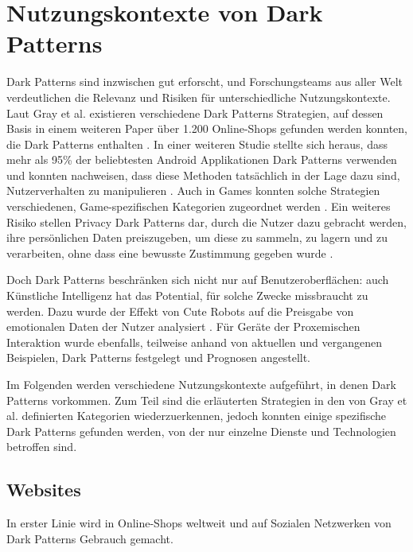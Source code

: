 \documentclass[a4paper]{article}
\begin{document}
\section{Nutzungskontexte von Dark Patterns} %
\label{sec:nutzungskontexte_von_dark_patterns}
Dark Patterns sind inzwischen gut erforscht, und Forschungsteams aus aller Welt verdeutlichen die Relevanz und Risiken für unterschiedliche Nutzungskontexte. Laut Gray et al. existieren verschiedene Dark Patterns Strategien, auf dessen Basis in einem weiteren Paper über 1.200 Online-Shops gefunden werden konnten, die Dark Patterns enthalten \cite{gray}\cite{mathur}. In einer weiteren Studie stellte sich heraus, dass mehr als 95\% der beliebtesten Android Applikationen Dark Patterns verwenden und konnten nachweisen, dass diese Methoden tatsächlich in der Lage dazu sind, Nutzerverhalten zu manipulieren \cite{geronimo}. Auch in Games konnten solche Strategien verschiedenen, Game-spezifischen Kategorien zugeordnet werden \cite{zagal}. Ein weiteres Risiko stellen \glqq Privacy Dark Patterns\grqq{} dar, durch die Nutzer dazu gebracht werden, ihre persönlichen Daten preiszugeben, um diese zu sammeln, zu lagern und zu verarbeiten, ohne dass eine bewusste Zustimmung gegeben wurde \cite{boesch}. 

Doch Dark Patterns beschränken sich nicht nur auf Benutzeroberflächen: auch Künstliche Intelligenz hat das Potential, für solche Zwecke missbraucht zu werden. Dazu wurde
der Effekt von \glqq Cute Robots\grqq{} auf die Preisgabe von emotionalen Daten der Nutzer analysiert \cite{lacey}. Für Geräte der Proxemischen Interaktion wurde ebenfalls, teilweise anhand von aktuellen und vergangenen Beispielen, Dark Patterns festgelegt und Prognosen angestellt.

Im Folgenden werden verschiedene Nutzungskontexte aufgeführt, in denen Dark Patterns vorkommen. Zum Teil sind die erläuterten Strategien in den von Gray et al. definierten Kategorien wiederzuerkennen, jedoch konnten einige spezifische Dark Patterns gefunden werden, von der nur einzelne Dienste und Technologien betroffen sind.

\subsection{Websites} 
\label{sub:websites}
In erster Linie wird in Online-Shops weltweit und auf Sozialen Netzwerken von Dark Patterns Gebrauch gemacht. 
\end{document}
